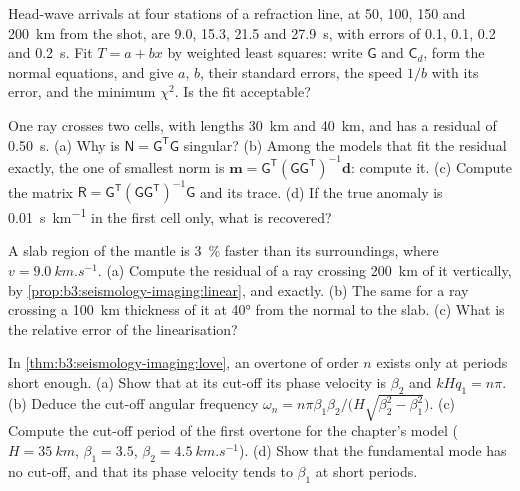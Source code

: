 \begin{exercise}[$\star\star$]\label{exo:b3:seismology-imaging:7}
Head-wave arrivals at four stations of a refraction line, at 50, 100, 150 and
\qty{200}{km} from the shot, are 9.0, 15.3, 21.5 and \qty{27.9}{s}, with
errors of 0.1, 0.1, 0.2 and \qty{0.2}{s}. Fit $T = a + bx$ by weighted least
squares: write $\mathsf G$ and $\mathsf C_d$, form the normal equations, and
give $a$, $b$, their standard errors, the speed $1/b$ with its error, and the
minimum $\chi^2$. Is the fit acceptable?
\end{exercise}

\begin{exercise}[$\star\star$]\label{exo:b3:seismology-imaging:8}
One ray crosses two cells, with lengths \qty{30}{km} and \qty{40}{km}, and has
a residual of \qty{0.50}{s}. (a) Why is $\mathsf N = \mathsf G^{\mathsf T}
\mathsf G$ singular? (b) Among the models that fit the residual exactly, the one
of smallest norm is $\mathbf m = \mathsf G^{\mathsf T}(\mathsf G\mathsf
G^{\mathsf T})^{-1}\mathbf d$: compute it. (c) Compute the matrix
$\mathsf R = \mathsf G^{\mathsf T}(\mathsf G\mathsf G^{\mathsf T})^{-1}\mathsf G$
and its trace. (d) If the true anomaly is \qty{0.01}{s.km^{-1}} in the first
cell only, what is recovered?
\end{exercise}

\begin{exercise}[$\star\star$]\label{exo:b3:seismology-imaging:9}
A slab region of the mantle is \qty{3}{\percent} faster than its surroundings,
where $v = \qty{9.0}{km.s^{-1}}$. (a) Compute the residual of a ray crossing
\qty{200}{km} of it vertically, by \cref{prop:b3:seismology-imaging:linear},
and exactly. (b) The same for a ray crossing a \qty{100}{km} thickness of it at
\ang{40} from the normal to the slab. (c) What is the relative error of the
linearisation?
\end{exercise}

\begin{exercise}[$\star\star\star$]\label{exo:b3:seismology-imaging:10}
In \cref{thm:b3:seismology-imaging:love}, an overtone of order $n$ exists only
at periods short enough. (a) Show that at its cut-off its phase velocity is
$\beta_2$ and $kHq_1 = n\pi$. (b) Deduce the cut-off angular frequency
$\omega_n = n\pi\beta_1\beta_2/\bigl(H\sqrt{\beta_2^2 - \beta_1^2}\bigr)$.
(c) Compute the cut-off period of the first overtone for the chapter's model
($H = \qty{35}{km}$, $\beta_1 = 3.5$, $\beta_2 = \qty{4.5}{km.s^{-1}}$).
(d) Show that the fundamental mode has no cut-off, and that its phase velocity
tends to $\beta_1$ at short periods.
\end{exercise}

